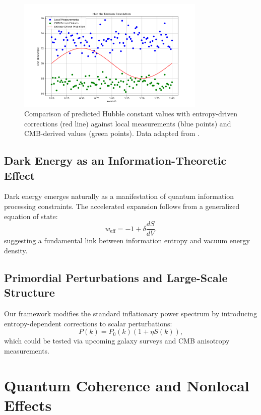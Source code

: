 \documentclass[12pt]{article}
\begin{document}
\begin{figure}[h!]
    \centering
    \includegraphics[width=0.8\textwidth]{hubble_tension.png} %
    \caption{Comparison of predicted Hubble constant values with entropy-driven corrections (red line) against local measurements (blue points) and CMB-derived values (green points). Data adapted from \cite{Riess2021, Planck2020}.}
    \label{fig:hubble_tension}
\end{figure}

\subsection{Dark Energy as an Information-Theoretic Effect}
Dark energy emerges naturally as a manifestation of quantum information processing constraints. The accelerated expansion follows from a generalized equation of state:
\begin{equation}
w_{\text{eff}} = -1 + \delta \frac{dS}{dV}.
\end{equation}
suggesting a fundamental link between information entropy and vacuum energy density.

\subsection{Primordial Perturbations and Large-Scale Structure}
Our framework modifies the standard inflationary power spectrum by introducing entropy-dependent corrections to scalar perturbations:
\begin{equation}
P(k) = P_0(k) \left(1 + \eta S(k)\right),
\end{equation}
which could be tested via upcoming galaxy surveys and CMB anisotropy measurements.

\section{Quantum Coherence and Nonlocal Effects}
\end{document}

